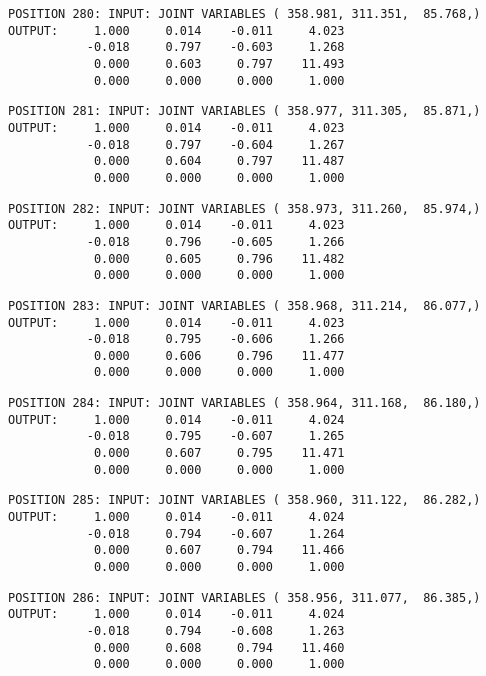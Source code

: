 \begin{verbatim}
POSITION 280: INPUT: JOINT VARIABLES ( 358.981, 311.351,  85.768,)
OUTPUT:     1.000     0.014    -0.011     4.023
           -0.018     0.797    -0.603     1.268
            0.000     0.603     0.797    11.493
            0.000     0.000     0.000     1.000
\end{verbatim} \pagebreak[1]\begin{verbatim}
POSITION 281: INPUT: JOINT VARIABLES ( 358.977, 311.305,  85.871,)
OUTPUT:     1.000     0.014    -0.011     4.023
           -0.018     0.797    -0.604     1.267
            0.000     0.604     0.797    11.487
            0.000     0.000     0.000     1.000
\end{verbatim} \pagebreak[1]\begin{verbatim}
POSITION 282: INPUT: JOINT VARIABLES ( 358.973, 311.260,  85.974,)
OUTPUT:     1.000     0.014    -0.011     4.023
           -0.018     0.796    -0.605     1.266
            0.000     0.605     0.796    11.482
            0.000     0.000     0.000     1.000
\end{verbatim} \pagebreak[1]\begin{verbatim}
POSITION 283: INPUT: JOINT VARIABLES ( 358.968, 311.214,  86.077,)
OUTPUT:     1.000     0.014    -0.011     4.023
           -0.018     0.795    -0.606     1.266
            0.000     0.606     0.796    11.477
            0.000     0.000     0.000     1.000
\end{verbatim} \pagebreak[1]\begin{verbatim}
POSITION 284: INPUT: JOINT VARIABLES ( 358.964, 311.168,  86.180,)
OUTPUT:     1.000     0.014    -0.011     4.024
           -0.018     0.795    -0.607     1.265
            0.000     0.607     0.795    11.471
            0.000     0.000     0.000     1.000
\end{verbatim} \pagebreak[1]\begin{verbatim}
POSITION 285: INPUT: JOINT VARIABLES ( 358.960, 311.122,  86.282,)
OUTPUT:     1.000     0.014    -0.011     4.024
           -0.018     0.794    -0.607     1.264
            0.000     0.607     0.794    11.466
            0.000     0.000     0.000     1.000
\end{verbatim} \pagebreak[1]\begin{verbatim}
POSITION 286: INPUT: JOINT VARIABLES ( 358.956, 311.077,  86.385,)
OUTPUT:     1.000     0.014    -0.011     4.024
           -0.018     0.794    -0.608     1.263
            0.000     0.608     0.794    11.460
            0.000     0.000     0.000     1.000
\end{verbatim} \pagebreak[1]\begin{verbatim}

\end{verbatim}

